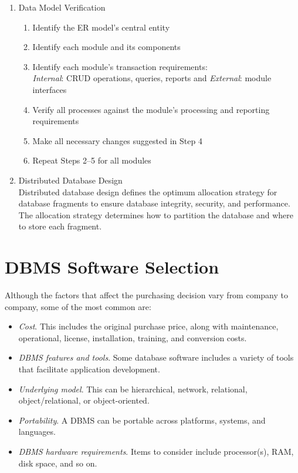 \documentclass[a4paper, 12pt, titlepage]{report}
\begin{document}
\begin{enumerate}
\item Data Model Verification
\begin{enumerate}
\item Identify the ER model’s central entity
\item Identify each module and its components
\item Identify each module’s transaction requirements: \\ \emph{Internal}: CRUD operations, queries, reports and \emph{External}: module interfaces
\item Verify all processes against the module’s processing and reporting requirements
\item Make all necessary changes suggested in Step 4
\item Repeat Steps 2–5 for all modules
\end{enumerate}
\item Distributed Database Design\\
Distributed database design defines the optimum allocation strategy for database fragments to ensure database integrity, security, and performance. The allocation strategy determines how to partition the database and where to store each fragment.
\end{enumerate}

\section{DBMS Software Selection}
Although the factors that affect the purchasing decision vary from company to company, some of the most common are:
\begin{itemize}
\item \emph{Cost}. This includes the original purchase price, along with maintenance, operational, license, installation, training, and conversion costs.
\item \emph{DBMS features and tools}. Some database software includes a variety of tools that facilitate application development.
\item \emph{Underlying model}. This can be hierarchical, network, relational, object/relational, or object-oriented.
\item \emph{Portability}. A DBMS can be portable across platforms, systems, and languages.
\item \emph{DBMS hardware requirements}. Items to consider include processor(s), RAM, disk space, and so on.
\end{itemize}
\end{document}
